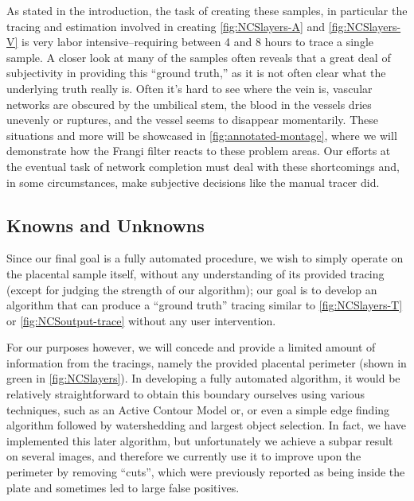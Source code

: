 As stated in the introduction, the task of creating these samples, in particular the tracing and estimation involved in creating \cref{fig:NCSlayers-A} and \cref{fig:NCSlayers-V} is very labor intensive--requiring between 4 and 8 hours to trace a single sample.
A closer look at many of the samples often reveals that a great deal of subjectivity in providing this ``ground truth,'' as it is not often clear what the underlying truth really is. Often it's hard to see where the vein is, vascular networks are obscured by the umbilical stem, the blood in the vessels dries unevenly or ruptures, and the vessel seems to disappear momentarily. These situations and more will be showcased in \cref{fig:annotated-montage}, where we will demonstrate how the Frangi filter reacts to these problem areas. Our efforts at the eventual task of network completion must deal with these shortcomings and, in some circumstances, make subjective decisions like the manual tracer did.


\subsection{Knowns and Unknowns}
Since our final goal is a fully automated procedure, we wish to simply operate on the placental sample itself, without any understanding of its provided tracing (except for judging the strength of our algorithm);
our goal is to develop an algorithm that can produce a ``ground truth'' tracing similar to \cref{fig:NCSlayers-T} or \cref{fig:NCSoutput-trace} without any user intervention.

For our purposes however, we will concede and provide a limited amount of information from the tracings, namely the provided placental perimeter (shown in green in \cref{fig:NCSlayers}). In developing a fully automated algorithm, it would be relatively straightforward to obtain this boundary ourselves using various techniques, such as an Active Contour Model \cite{activecontours} or, or even a simple edge finding algorithm followed by watershedding and largest object selection. In fact, we have implemented this later algorithm, but unfortunately we achieve a subpar result on several images, and therefore we currently use it to improve upon the perimeter by removing ``cuts'', which were previously reported as being inside the plate and sometimes led to large false positives. %

